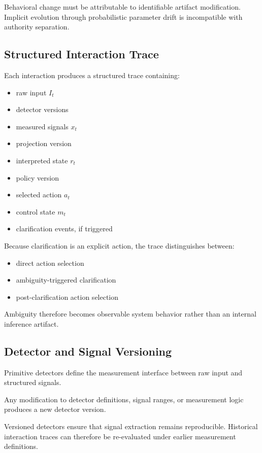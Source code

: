 \documentclass[11pt]{article}
\begin{document}
Behavioral change must be attributable to identifiable artifact modification. Implicit evolution through probabilistic parameter drift is incompatible with authority separation.

\subsection{Structured Interaction Trace}

Each interaction produces a structured trace containing:

\begin{itemize}
  \item raw input $I_t$
  \item detector versions
  \item measured signals $x_t$
  \item projection version
  \item interpreted state $r_t$
  \item policy version
  \item selected action $a_t$
  \item control state $m_t$
  \item clarification events, if triggered
\end{itemize}

Because clarification is an explicit action, the trace distinguishes between:

\begin{itemize}
  \item direct action selection
  \item ambiguity-triggered clarification
  \item post-clarification action selection
\end{itemize}

Ambiguity therefore becomes observable system behavior rather than an internal inference artifact.

\subsection{Detector and Signal Versioning}

Primitive detectors define the measurement interface between raw input and structured signals.

Any modification to detector definitions, signal ranges, or measurement logic produces a new detector version.

Versioned detectors ensure that signal extraction remains reproducible. Historical interaction traces can therefore be re-evaluated under earlier measurement definitions.
\end{document}
